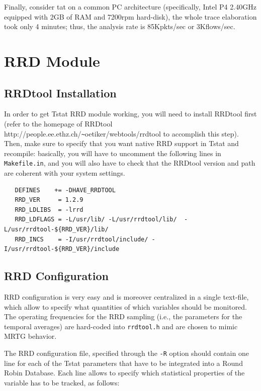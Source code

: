 \documentclass[11pt]{article}
\begin{document}
Finally, consider tat on a common PC architecture (specifically,
Intel P4 2.40GHz equipped with 2GB of RAM and 7200rpm hard-disk),
the whole trace elaboration took only 4 minutes; thus, the 
analysis rate is 85Kpkts/sec or 3Kflows/sec.

\section{RRD Module\label{RRD_Module}}
\subsection{RRDtool Installation\label{RRDtool_Installation}}


In order to get Tstat RRD module working, you will need to
install RRDtool first (refer to the homepage of RRDtool 
\textsf{http://people.ee.ethz.ch/\texttt{\~{}}oetiker/webtools/rrdtool} 
to accomplish this step). Then, make sure to specify
that you want native RRD support in Tstat and recompile: basically, you 
will have to uncomment the following lines in \texttt{Makefile.in}, and 
you will  also have to check that the RRDtool version and path 
are coherent with your system settings.

\begin{small}\begin{verbatim}
   DEFINES    += -DHAVE_RRDTOOL
   RRD_VER     = 1.2.9
   RRD_LDLIBS  = -lrrd
   RRD_LDFLAGS = -L/usr/lib/ -L/usr/rrdtool/lib/  -L/usr/rrdtool-${RRD_VER}/lib/
   RRD_INCS    = -I/usr/rrdtool/include/ -I/usr/rrdtool-${RRD_VER}/include
\end{verbatim}\end{small} \noindent
\subsection{RRD Configuration\label{RRD_Configuration}}


RRD configuration is very easy and is moreover centralized
in a single text-file, which allow to specify what quantities
of which variables should be monitored. The operating frequencies
for the RRD sampling (i.e., the parameters for the temporal 
averages) are hard-coded into \texttt{rrdtool.h} and are chosen to 
mimic MRTG behavior.



The RRD configuration file, specified through the \texttt{-R} option 
should contain one line for each of the Tstat parameters that have 
to be integrated into a Round Robin Database. Each line allows to 
specify which statistical properties of the variable has to be tracked,
as follows:
\end{document}

